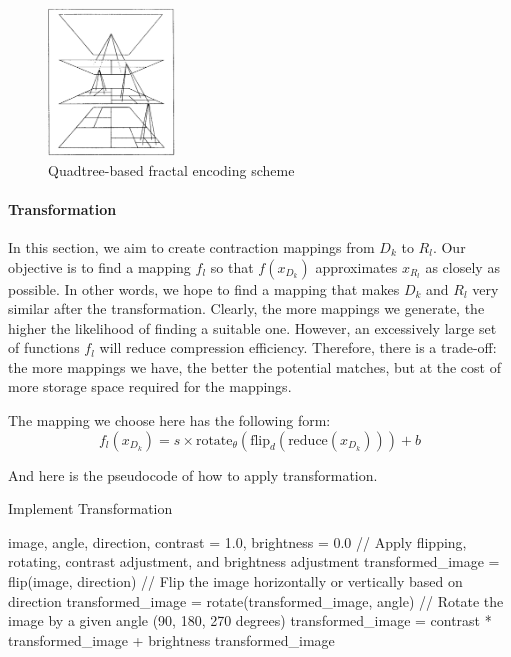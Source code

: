 \documentclass[a4paper,11pt, titlepage]{article}
\theoremstyle{definition}
\theoremstyle{plain}
\theoremstyle{remark}
\theoremstyle{definition}
\begin{document}
\begin{figure}[ht]
    \centering
    \includegraphics[width=0.3\textwidth]{pic3}
    \caption{Quadtree-based fractal encoding scheme}
    \label{fig:quadtree}
\end{figure}

\paragraph{Transformation}
In this section, we aim to create contraction mappings from \( D_k \) to \( R_l \). Our objective is to find a mapping \( f_l \) so that \( f(x_{D_k}) \) approximates \( x_{R_l} \) as closely as possible. In other words, we hope to find a mapping that makes \( D_k \) and \( R_l \) very similar after the transformation. Clearly, the more mappings we generate, the higher the likelihood of finding a suitable one. However, an excessively large set of functions \( f_l \) will reduce compression efficiency. Therefore, there is a trade-off: the more mappings we have, the better the potential matches, but at the cost of more storage space required for the mappings.

The mapping we choose here has the following form:
\[
f_l (x_{D_k}) = s \times \text{rotate}_\theta (\text{flip}_d (\text{reduce}(x_{D_k}))) + b
\]

And here is the pseudocode of how to apply transformation.
\begin{algorithm}
\caption{Implement Transformation}
\begin{algorithmic}[1]
\REQUIRE image, angle, direction, contrast = 1.0, brightness = 0.0
\STATE // Apply flipping, rotating, contrast adjustment, and brightness adjustment
\STATE transformed\_image = flip(image, direction)
\STATE // Flip the image horizontally or vertically based on direction
\STATE transformed\_image = rotate(transformed\_image, angle)
\STATE // Rotate the image by a given angle (90, 180, 270 degrees)
\STATE transformed\_image = contrast * transformed\_image + brightness
\RETURN transformed\_image
\end{algorithmic}
\end{algorithm}
\end{document}
